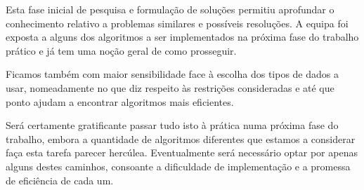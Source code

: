 \documentclass[12pt,a4paper,reqno]{report}
\numberwithin{figure}{section}
\numberwithin{equation}{section}
\begin{document}
Esta fase inicial de pesquisa e formulação de soluções permitiu aprofundar o conhecimento relativo a problemas similares e possíveis resoluções. A equipa foi exposta a alguns dos algoritmos a ser implementados na próxima fase do trabalho prático e já tem uma noção geral de como prosseguir.

Ficamos também com maior sensibilidade face à escolha dos tipos de dados a usar, nomeadamente no que diz respeito às restrições consideradas e até que ponto ajudam a encontrar algoritmos mais eficientes.

Será certamente gratificante passar tudo isto à prática numa próxima fase do trabalho, embora a quantidade de algoritmos diferentes que estamos a considerar faça esta tarefa parecer hercúlea. Eventualmente será necessário optar por apenas alguns destes caminhos, consoante a dificuldade de implementação e a promessa de eficiência de cada um.



\end{document}
